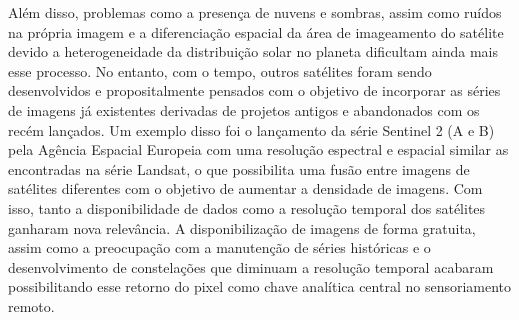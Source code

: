 \documentclass[twocolumn]{article}
\begin{document}
Além disso, problemas como a presença de nuvens e sombras, assim como ruídos na própria imagem e a diferenciação espacial da área de imageamento do satélite devido a heterogeneidade da distribuição solar no planeta dificultam ainda mais esse processo. No entanto, com o tempo, outros satélites foram sendo desenvolvidos e propositalmente pensados com o objetivo de incorporar as séries de imagens já existentes derivadas de projetos antigos e abandonados com os recém lançados. Um exemplo disso foi o lançamento da série Sentinel 2 (A e B) pela Agência Espacial Europeia com uma resolução espectral e espacial similar as encontradas na série Landsat, o que possibilita uma fusão entre imagens de satélites diferentes com o objetivo de aumentar a densidade de imagens. Com isso, tanto a disponibilidade de dados como a resolução temporal dos satélites ganharam nova relevância. A disponibilização de imagens de forma gratuita, assim como a preocupação com a manutenção de séries históricas e o desenvolvimento de constelações que diminuam a resolução temporal acabaram possibilitando esse retorno do pixel como chave analítica central no sensoriamento remoto.
\par
\end{document}
